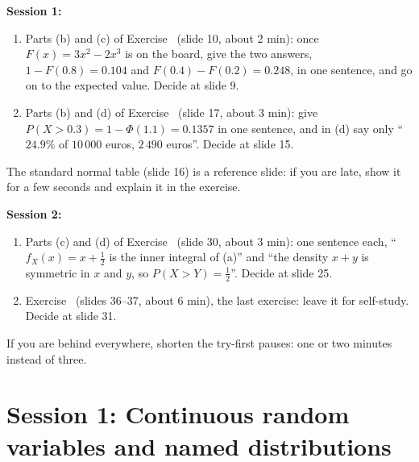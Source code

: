 \documentclass[11pt,a4paper,parskip=half]{scrartcl}
\begin{document}
\begin{printskip}
\begin{cue}
	\textbf{Session 1:}
	\begin{enumerate}
		\item Parts (b) and (c) of Exercise~ (slide 10,
		      about 2 min): once $F(x)=3x^2-2x^3$ is on the board, give the two
		      answers, $1-F(0.8)=0.104$ and $F(0.4)-F(0.2)=0.248$, in one
		      sentence, and go on to the expected value. Decide at slide 9.
		\item Parts (b) and (d) of Exercise~ (slide 17,
		      about 3 min): give $P(X>0.3)=1-\Phi(1.1)=0.1357$ in one sentence,
		      and in (d) say only ``$24.9\%$ of $10\,000$ euros, $2\,490$
		      euros''. Decide at slide 15.
	\end{enumerate}
	The standard normal table (slide 16) is a reference slide: if you are
	late, show it for a few seconds and explain it in the exercise.

	\textbf{Session 2:}
	\begin{enumerate}
		\item Parts (c) and (d) of Exercise~
		      (slide 30, about 3 min): one sentence each, ``$f_X(x)=x+\frac12$
		      is the inner integral of (a)'' and ``the density $x+y$ is
		      symmetric in $x$ and $y$, so $P(X>Y)=\frac12$''. Decide at
		      slide 25.
		\item Exercise~ (slides 36--37, about 6 min), the
		      last exercise: leave it for self-study. Decide at slide 31.
	\end{enumerate}

	If you are behind everywhere, shorten the try-first pauses: one or two
	minutes instead of three.
\end{cue}
\end{printskip}

\ifdefined\scriptprint\else\tableofcontents\fi

\section{Session 1: Continuous random variables and named distributions}
\end{document}
